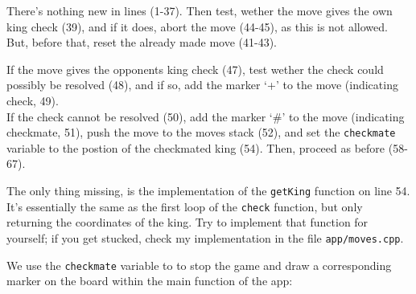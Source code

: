 There's nothing new in lines (1-37).
Then test, wether the move gives the own king check (39), and if it does, abort the move (44-45), as
this is not allowed.\\
But, before that, reset the already made move (41-43).

If the move gives the opponents king check (47), test wether the check could possibly be
resolved (48), and if so, add the marker `+' to the move (indicating check, 49).\\
If the check cannot be resolved (50), add the marker `\#' to the move (indicating checkmate, 51),
push the move to the moves stack (52), and set the \texttt{checkmate} variable to the postion
of the checkmated king (54).
Then, proceed as before (58-67).

The only thing missing, is the implementation of the \texttt{getKing} function on line 54.
It's essentially the same as the first loop of the \texttt{check} function, but only returning
the coordinates of the king.
Try to implement that function for yourself; if you get stucked, check my implementation in the
file \texttt{app/moves.cpp}.

We use the \texttt{checkmate} variable to to stop the game and draw a corresponding marker on the board
within the main function of the app:

